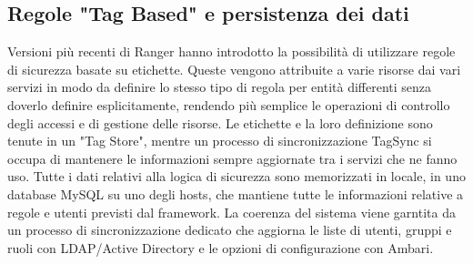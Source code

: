 \subsection{Regole "Tag Based" e persistenza dei dati}

Versioni più recenti di Ranger hanno introdotto la possibilità di utilizzare regole di sicurezza basate su etichette. Queste vengono attribuite a varie risorse dai vari servizi in modo da definire lo stesso tipo di regola per entità differenti senza doverlo definire esplicitamente, rendendo più semplice le operazioni di controllo degli accessi e di gestione delle risorse. Le etichette e la loro definizione sono tenute in un "Tag Store", mentre un processo di sincronizzazione TagSync si occupa di mantenere le informazioni sempre aggiornate tra i servizi che ne fanno uso.
\newline
Tutte i dati relativi alla logica di sicurezza sono memorizzati in locale, in uno database MySQL su uno degli hosts, che mantiene tutte le informazioni relative a regole e utenti previsti dal framework. La coerenza del sistema viene garntita da un processo di sincronizzazione dedicato che aggiorna le liste di utenti, gruppi e ruoli con LDAP/Active Directory e le opzioni di configurazione con Ambari.
\newline